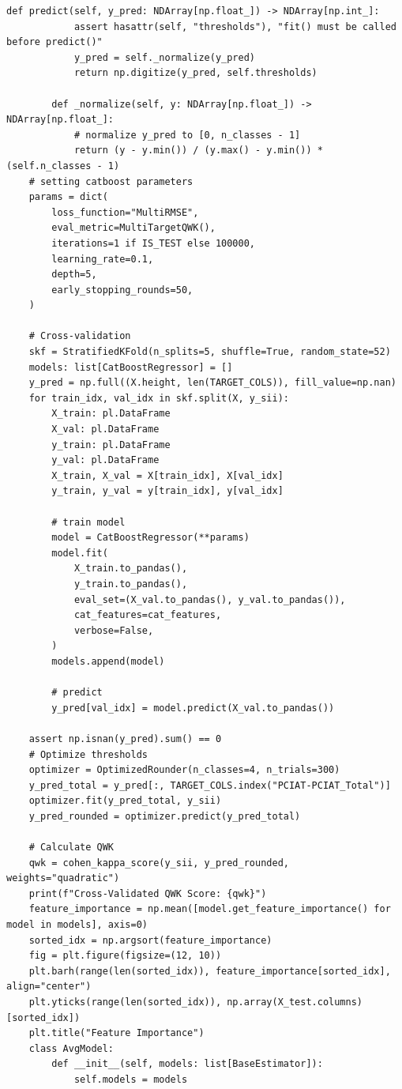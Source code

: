 \begin{appendices}
\begin{mdframed}
\begin{lstlisting}[breaklines=true]
        def predict(self, y_pred: NDArray[np.float_]) -> NDArray[np.int_]:
            assert hasattr(self, "thresholds"), "fit() must be called before predict()"
            y_pred = self._normalize(y_pred)
            return np.digitize(y_pred, self.thresholds)

        def _normalize(self, y: NDArray[np.float_]) -> NDArray[np.float_]:
            # normalize y_pred to [0, n_classes - 1]
            return (y - y.min()) / (y.max() - y.min()) * (self.n_classes - 1)
    # setting catboost parameters
    params = dict(
        loss_function="MultiRMSE",
        eval_metric=MultiTargetQWK(),
        iterations=1 if IS_TEST else 100000,
        learning_rate=0.1,
        depth=5,
        early_stopping_rounds=50,
    )

    # Cross-validation
    skf = StratifiedKFold(n_splits=5, shuffle=True, random_state=52)
    models: list[CatBoostRegressor] = []
    y_pred = np.full((X.height, len(TARGET_COLS)), fill_value=np.nan)
    for train_idx, val_idx in skf.split(X, y_sii):
        X_train: pl.DataFrame
        X_val: pl.DataFrame
        y_train: pl.DataFrame
        y_val: pl.DataFrame
        X_train, X_val = X[train_idx], X[val_idx]
        y_train, y_val = y[train_idx], y[val_idx]

        # train model
        model = CatBoostRegressor(**params)
        model.fit(
            X_train.to_pandas(),
            y_train.to_pandas(),
            eval_set=(X_val.to_pandas(), y_val.to_pandas()),
            cat_features=cat_features,
            verbose=False,
        )
        models.append(model)

        # predict
        y_pred[val_idx] = model.predict(X_val.to_pandas())

    assert np.isnan(y_pred).sum() == 0
    # Optimize thresholds
    optimizer = OptimizedRounder(n_classes=4, n_trials=300)
    y_pred_total = y_pred[:, TARGET_COLS.index("PCIAT-PCIAT_Total")]
    optimizer.fit(y_pred_total, y_sii)
    y_pred_rounded = optimizer.predict(y_pred_total)

    # Calculate QWK
    qwk = cohen_kappa_score(y_sii, y_pred_rounded, weights="quadratic")
    print(f"Cross-Validated QWK Score: {qwk}")
    feature_importance = np.mean([model.get_feature_importance() for model in models], axis=0)
    sorted_idx = np.argsort(feature_importance)
    fig = plt.figure(figsize=(12, 10))
    plt.barh(range(len(sorted_idx)), feature_importance[sorted_idx], align="center")
    plt.yticks(range(len(sorted_idx)), np.array(X_test.columns)[sorted_idx])
    plt.title("Feature Importance")
    class AvgModel:
        def __init__(self, models: list[BaseEstimator]):
            self.models = models


\end{lstlisting}
\end{mdframed}
\end{appendices}
